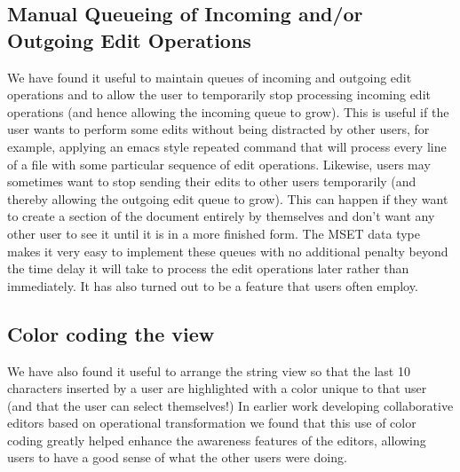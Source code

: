 \documentclass{amsart}
\begin{document}
\subsection{Manual Queueing of Incoming and/or Outgoing Edit Operations}
We have found it useful to maintain queues of incoming and outgoing edit operations
and to allow the user to temporarily stop processing incoming edit operations (and hence allowing the incoming queue to grow).  This is useful if the user wants to perform some edits without being distracted by other users, for example, applying an emacs style repeated command that will process every line of a file with some particular sequence of edit operations.  Likewise, users may sometimes want to stop sending their edits to other users temporarily (and thereby allowing the outgoing edit queue to grow).  This can happen if they want to create a section of the document entirely by themselves and don't want any other user to see it until it is in a more finished form.  The MSET data type makes it very easy to implement these queues with no additional penalty beyond the time delay it will take to process the edit operations later rather than immediately. It has also turned out to be a feature that users often employ.

\subsection{Color coding the view}
We have also found it useful to arrange the string view so that the last 10 characters inserted by a user are highlighted with a color unique to that user (and that the user can select themselves!)  In earlier work developing collaborative editors based on operational transformation we found that this use of color coding greatly helped enhance the awareness features of the editors, allowing users to have a good sense of what the other users were doing.
\end{document}
